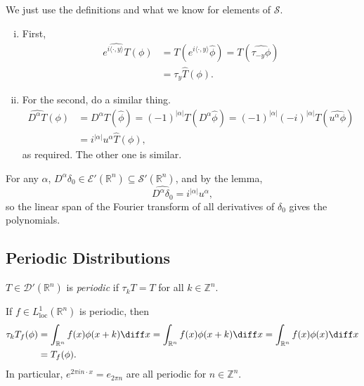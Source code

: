 \documentclass[12pt]{article}
\begin{document}
\begin{proofbox}
	We just use the definitions and what we know for elements of $\mathcal{S}$.

	\begin{enumerate}[(i)]
		\item First,
			\begin{align*}
				\widehat{e^{i\langle \cdot, y\rangle} T} (\phi) &= T(e^{i\langle \cdot, y\rangle} \hat \phi) = T(\widehat{\tau_{-y} \phi}) \\
										&= \tau_y \hat T(\phi).
			\end{align*}
		\item For the second, do a similar thing.
			\begin{align*}
				\widehat{D^\alpha T}(\phi) &= D^\alpha T(\widehat \phi) = (-1)^{|\alpha|} T(D^\alpha \hat \phi) = (-1)^{|\alpha|} (-i)^{|\alpha|} T(\widehat{u^\alpha \phi}) \\
							   &= i^{|\alpha|} u^\alpha \hat T(\phi),
			\end{align*}
			as required. The other one is similar.
	\end{enumerate}
\end{proofbox}

For any $\alpha$, $D^\alpha \delta_0 \in \mathcal{E}'(\mathbb{R}^n) \subseteq \mathcal{S}'(\mathbb{R}^n)$, and by the lemma,
\[
	\widehat{D^\alpha \delta_0} = i^{|\alpha|} u^\alpha,
\]
so the linear span of the Fourier transform of all derivatives of $\delta_0$ gives the polynomials.

\subsection{Periodic Distributions}
\label{sub:per_d}

\begin{definition}
	$T \in \mathcal{D}'(\mathbb{R}^n)$ is \emph{periodic} if $\tau_k T = T$ for all $k \in \mathbb{Z}^n$.
\end{definition}

\begin{exbox}
	If $f \in L^1_{\mathrm{loc}}(\mathbb{R}^n)$ is periodic, then
	\begin{align*}
		\tau_k T_f(\phi) &= \int_{\mathbb{R}^n} f(x) \phi(x + k) \diff x = \int_{\mathbb{R}^n} f(x) \phi(x + k) \diff x = \int_{\mathbb{R}^n} f(x) \phi(x) \diff x \\
				 &= T_f (\phi).
	\end{align*}
	In particular, $e^{2\pi i n \cdot x} = e_{2 \pi n}$ are all periodic for $n \in \mathbb{Z}^n$.
\end{exbox}
\end{document}

